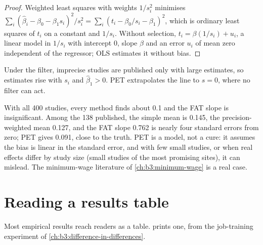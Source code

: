 \begin{proof}
Weighted least squares with weights $1/s_i^2$ minimises $\sum_i (\hat\beta_i -
\beta_0 - \beta_1 s_i)^2/s_i^2 = \sum_i (t_i - \beta_0/s_i - \beta_1)^2$, which is
ordinary least squares of $t_i$ on a constant and $1/s_i$. Without selection,
$t_i = \beta (1/s_i) + u_i$, a linear model in $1/s_i$ with intercept 0, slope
$\beta$ and an error $u_i$ of mean zero independent of the regressor; OLS
estimates it without bias.
\end{proof}

Under the filter, imprecise studies are published only with large estimates,
so estimates rise with $s_i$ and $\hat\beta_1 > 0$. PET extrapolates the line to
$s = 0$, where no filter can act.

\label{lst:b3:credible-empirical-work:funnel}

\label{out:b3:credible-empirical-work:funnel}

With all 400 studies, every method finds about 0.1 and the FAT slope is
insignificant. Among the 138 published, the simple mean is 0.145, the
precision-weighted mean 0.127, and the FAT slope 0.762 is nearly four standard
errors from zero; PET gives 0.091, close to the truth. %
PET is a model, not a cure: it assumes the bias is linear in the standard
error, and with few small studies, or when real effects differ by study size
(small studies of the most promising sites), it can mislead. The minimum-wage
literature of \cref{ch:b3:minimum-wage} is a real case.

\section{Reading a results table}\label{sec:b3:credible-empirical-work:table}

Most empirical results reach readers as a table. 
prints one, from the job-training experiment of
\cref{ch:b3:difference-in-differences}.

\label{lst:b3:credible-empirical-work:table}


